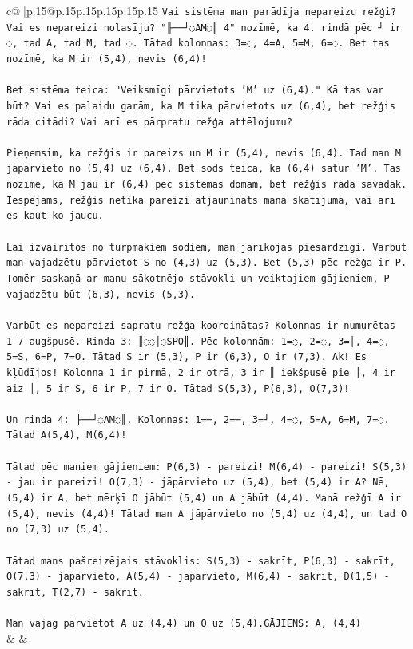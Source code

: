 \documentclass{article}
\begin{document}
{\begin{supertabular}{c@{$\;$}|p{.15\linewidth}@{}p{.15\linewidth}p{.15\linewidth}p{.15\linewidth}p{.15\linewidth}p{.15\linewidth}}
{{{\texttt{Vai sistēma man parādīja nepareizu režģi? Vai es nepareizi nolasīju? "╟──┘◌AM◌║ 4" nozīmē, ka 4. rindā pēc ┘ ir ◌, tad A, tad M, tad ◌. Tātad kolonnas: 3=◌, 4=A, 5=M, 6=◌. Bet tas nozīmē, ka M ir (5,4), nevis (6,4)!} \\
\\ 
\texttt{Bet sistēma teica: "Veiksmīgi pārvietots 'M' uz (6,4)." Kā tas var būt? Vai es palaidu garām, ka M tika pārvietots uz (6,4), bet režģis rāda citādi? Vai arī es pārpratu režģa attēlojumu?} \\
\\ 
\texttt{Pieņemsim, ka režģis ir pareizs un M ir (5,4), nevis (6,4). Tad man M jāpārvieto no (5,4) uz (6,4). Bet sods teica, ka (6,4) satur 'M'. Tas nozīmē, ka M jau ir (6,4) pēc sistēmas domām, bet režģis rāda savādāk. Iespējams, režģis netika pareizi atjaunināts manā skatījumā, vai arī es kaut ko jaucu.} \\
\\ 
\texttt{Lai izvairītos no turpmākiem sodiem, man jārīkojas piesardzīgi. Varbūt man vajadzētu pārvietot S no (4,3) uz (5,3). Bet (5,3) pēc režģa ir P. Tomēr saskaņā ar manu sākotnējo stāvokli un veiktajiem gājieniem, P vajadzētu būt (6,3), nevis (5,3). } \\
\\ 
\texttt{Varbūt es nepareizi sapratu režģa koordinātas? Kolonnas ir numurētas 1{-}7 augšpusē. Rinda 3: ║◌◌│◌SPO║. Pēc kolonnām: 1=◌, 2=◌, 3=│, 4=◌, 5=S, 6=P, 7=O. Tātad S ir (5,3), P ir (6,3), O ir (7,3). Ak! Es kļūdījos! Kolonna 1 ir pirmā, 2 ir otrā, 3 ir ║ iekšpusē pie │, 4 ir aiz │, 5 ir S, 6 ir P, 7 ir O. Tātad S(5,3), P(6,3), O(7,3)!} \\
\\ 
\texttt{Un rinda 4: ╟──┘◌AM◌║. Kolonnas: 1=─, 2=─, 3=┘, 4=◌, 5=A, 6=M, 7=◌. Tātad A(5,4), M(6,4)!} \\
\\ 
\texttt{Tātad pēc maniem gājieniem: P(6,3) {-} pareizi! M(6,4) {-} pareizi! S(5,3) {-} jau ir pareizi! O(7,3) {-} jāpārvieto uz (5,4), bet (5,4) ir A? Nē, (5,4) ir A, bet mērķī O jābūt (5,4) un A jābūt (4,4). Manā režģī A ir (5,4), nevis (4,4)! Tātad man A jāpārvieto no (5,4) uz (4,4), un tad O no (7,3) uz (5,4).} \\
\\ 
\texttt{Tātad mans pašreizējais stāvoklis: S(5,3) {-} sakrīt, P(6,3) {-} sakrīt, O(7,3) {-} jāpārvieto, A(5,4) {-} jāpārvieto, M(6,4) {-} sakrīt, D(1,5) {-} sakrīt, T(2,7) {-} sakrīt.} \\
\\ 
\texttt{Man vajag pārvietot A uz (4,4) un O uz (5,4).GĀJIENS: A, (4,4)} \\
            }
        }
    }
    & & \\ \\


\end{supertabular}}
\end{document}
